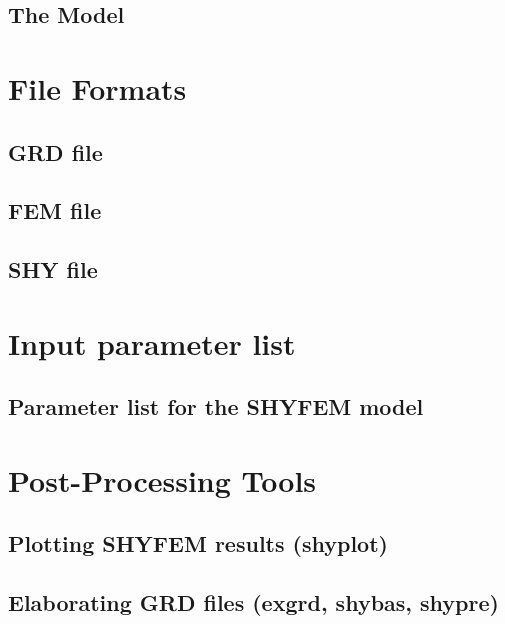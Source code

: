 \documentclass{report}
\begin{document}
	\section{The Model}
	

\chapter{File Formats}
	\section{GRD file}
	

	\section{FEM file}
	

	\section{SHY file}
	



\chapter{Input parameter list}
      \section{Parameter list for the SHYFEM model}
        \label{param_list}
	

\chapter{Post-Processing Tools}
	\section{Plotting SHYFEM results (shyplot)}
	

      \section{Elaborating GRD files (exgrd, shybas, shypre)}
      \label{elab_grd}
\end{document}
